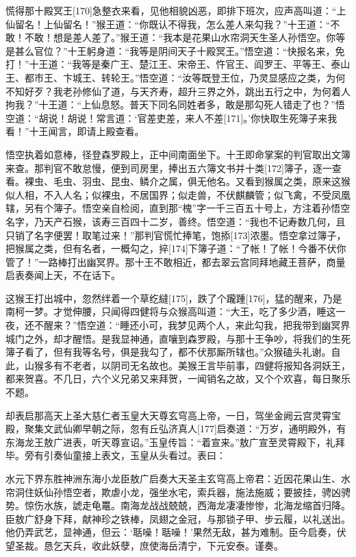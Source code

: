 \documentclass[12pt,UTF8]{ctexbook}
\begin{document}
慌得那十殿冥王[170]急整衣来看，见他相貌凶恶，即排下班次，应声高叫道：“上仙留名！上仙留名！”猴王道：“你既认不得我，怎么差人来勾我？”十王道：“不敢！不敢！想是差人差了。”猴王道：“我本是花果山水帘洞天生圣人孙悟空。你等是甚么官位？”十王躬身道：“我等是阴间天子十殿冥王。”悟空道：“快报名来，免打！”十王道：“我等是秦广王、楚江王、宋帝王、忤官王、阎罗王、平等王、泰山王、都市王、卞城王、转轮王。”悟空道：“汝等既登王位，乃灵显感应之类，为何不知好歹？我老孙修仙了道，与天齐寿，超升三界之外，跳出五行之中，为何着人拘我？”十王道：“上仙息怒。普天下同名同姓者多，敢是那勾死人错走了也？”悟空道：“胡说！胡说！常言道：‘官差吏差，来人不差[171]。’你快取生死簿子来我看！”十王闻言，即请上殿查看。

悟空执着如意棒，径登森罗殿上，正中间南面坐下。十王即命掌案的判官取出文簿来查。那判官不敢怠慢，便到司房里，捧出五六簿文书并十类[172]簿子，逐一查看。裸虫、毛虫、羽虫、昆虫、鳞介之属，俱无他名。又看到猴属之类，原来这猴似人相，不入人名；似裸虫，不居国界；似走兽，不伏麒麟管；似飞禽，不受凤凰辖，另有个簿子。悟空亲自检阅，直到那“槐”字一千三百五十号上，方注着孙悟空名字，乃天产石猴，该寿三百四十二岁，善终。悟空道：“我也不记寿数几何，且只销了名字便罢！取笔过来！”那判官慌忙捧笔，饱掭[173]浓墨。悟空拿过簿子，把猴属之类，但有名者，一概勾之，捽[174]下簿子道：“了帐！了帐！今番不伏你管了！”一路棒打出幽冥界。那十王不敢相近，都去翠云宫同拜地藏王菩萨，商量启表奏闻上天，不在话下。

这猴王打出城中，忽然绊着一个草纥繨[175]，跌了个躘踵[176]，猛的醒来，乃是南柯一梦。才觉伸腰，只闻得四健将与众猴高叫道：“大王，吃了多少酒，睡这一夜，还不醒来？”悟空道：“睡还小可，我梦见两个人，来此勾我，把我带到幽冥界城门之外，却才醒悟。是我显神通，直嚷到森罗殿，与那十王争吵，将我们的生死簿子看了，但有我等名号，俱是我勾了，都不伏那厮所辖也。”众猴磕头礼谢。自此，山猴多有不老者，以阴司无名故也。美猴王言毕前事，四健将报知各洞妖王，都来贺喜。不几日，六个义兄弟又来拜贺，一闻销名之故，又个个欢喜，每日聚乐不题。

却表启那高天上圣大慈仁者玉皇大天尊玄穹高上帝，一日，驾坐金阙云宫灵霄宝殿，聚集文武仙卿早朝之际，忽有丘弘济真人[177]启奏道：“万岁，通明殿外，有东海龙王敖广进表，听天尊宣诏。”玉皇传旨：“着宣来。”敖广宣至灵霄殿下，礼拜毕。旁有引奏仙童接上表文，玉皇从头看过。表曰：

水元下界东胜神洲东海小龙臣敖广启奏大天圣主玄穹高上帝君：近因花果山生、水帘洞住妖仙孙悟空者，欺虐小龙，强坐水宅，索兵器，施法施威；要披挂，骋凶骋势。惊伤水族，諕走龟鼍。南海龙战战兢兢，西海龙凄凄惨惨，北海龙缩首归降。臣敖广舒身下拜，献神珍之铁棒，凤翅之金冠，与那锁子甲、步云履，以礼送出。他仍弄武艺，显神通，但云：‘聒噪！聒噪！’果然无敌，甚为难制。臣今启奏，伏望圣裁。恳乞天兵，收此妖孽，庶使海岳清宁，下元安泰。谨奏。
\end{document}
